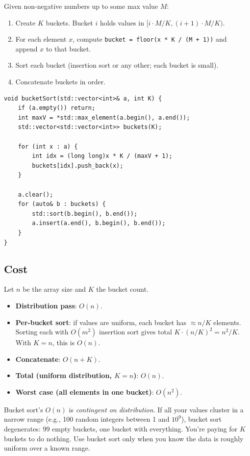 \documentclass[11pt]{article}
\begin{document}
Given non-negative numbers up to some max value $M$:

\begin{enumerate}[leftmargin=*]
    \item Create $K$ buckets. Bucket $i$ holds values in $[i \cdot M/K, (i+1) \cdot M/K)$.
    \item For each element $x$, compute \texttt{bucket = floor(x * K / (M + 1))} and append $x$ to that bucket.
    \item Sort each bucket (insertion sort or any other; each bucket is small).
    \item Concatenate buckets in order.
\end{enumerate}

\begin{lstlisting}[basicstyle=\ttfamily\small,frame=single]
void bucketSort(std::vector<int>& a, int K) {
    if (a.empty()) return;
    int maxV = *std::max_element(a.begin(), a.end());
    std::vector<std::vector<int>> buckets(K);

    for (int x : a) {
        int idx = (long long)x * K / (maxV + 1);
        buckets[idx].push_back(x);
    }

    a.clear();
    for (auto& b : buckets) {
        std::sort(b.begin(), b.end());
        a.insert(a.end(), b.begin(), b.end());
    }
}
\end{lstlisting}

\subsection*{Cost}

Let $n$ be the array size and $K$ the bucket count.
\begin{itemize}[leftmargin=*]
    \item \textbf{Distribution pass}: $O(n)$.
    \item \textbf{Per-bucket sort}: if values are uniform, each bucket has $\approx n/K$ elements. Sorting each with $O(m^2)$ insertion sort gives total $K \cdot (n/K)^2 = n^2/K$. With $K = n$, this is $O(n)$.
    \item \textbf{Concatenate}: $O(n + K)$.
    \item \textbf{Total (uniform distribution, $K = n$)}: $O(n)$.
    \item \textbf{Worst case (all elements in one bucket)}: $O(n^2)$.
\end{itemize}

\begin{warnbox}
Bucket sort's $O(n)$ is \emph{contingent on distribution}. If all your values cluster in a narrow range (e.g., 100 random integers between 1 and $10^9$), bucket sort degenerates: 99 empty buckets, one bucket with everything. You're paying for $K$ buckets to do nothing. Use bucket sort only when you know the data is roughly uniform over a known range.
\end{warnbox}
\end{document}

